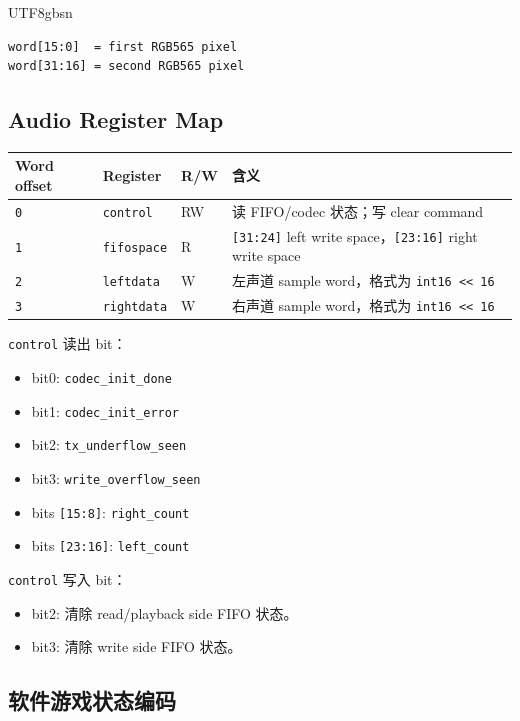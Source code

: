 \documentclass[12pt,a4paper]{article}
\begin{document}
\begin{CJK*}{UTF8}{gbsn}
\begin{lstlisting}[style=fighterstyle]
word[15:0]  = first RGB565 pixel
word[31:16] = second RGB565 pixel
\end{lstlisting}

\subsection{Audio Register Map}

\begin{longtable}{>{\raggedright\arraybackslash}p{} >{\raggedright\arraybackslash}p{} >{\raggedright\arraybackslash}p{} >{\raggedright\arraybackslash}p{}}
\toprule
Word offset & Register & R/W & 含义 \\
\midrule
\endhead
\texttt{0} & \texttt{control} & RW & 读 FIFO/codec 状态；写 clear command \\
\texttt{1} & \texttt{fifospace} & R & \texttt{[31:24]} left write space，\texttt{[23:16]} right write space \\
\texttt{2} & \texttt{leftdata} & W & 左声道 sample word，格式为 \texttt{int16 << 16} \\
\texttt{3} & \texttt{rightdata} & W & 右声道 sample word，格式为 \texttt{int16 << 16} \\
\bottomrule
\end{longtable}

\texttt{control} 读出 bit：

\begin{itemize}
  \item bit0: \texttt{codec\_init\_done}
  \item bit1: \texttt{codec\_init\_error}
  \item bit2: \texttt{tx\_underflow\_seen}
  \item bit3: \texttt{write\_overflow\_seen}
  \item bits \texttt{[15:8]}: \texttt{right\_count}
  \item bits \texttt{[23:16]}: \texttt{left\_count}
\end{itemize}

\texttt{control} 写入 bit：

\begin{itemize}
  \item bit2: 清除 read/playback side FIFO 状态。
  \item bit3: 清除 write side FIFO 状态。
\end{itemize}

\subsection{软件游戏状态编码}


\end{CJK*}
\end{document}

